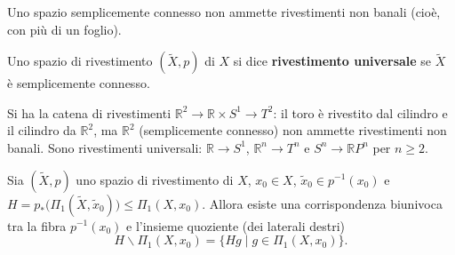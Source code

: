 \begin{observacion}
Uno spazio semplicemente connesso non ammette rivestimenti non banali (cio\`e, con pi\`u di un foglio).
\end{observacion}

\begin{definicion}
Uno spazio di rivestimento $(\widetilde{X}, p)$ di $X$ si dice \textbf{rivestimento universale} se $\widetilde{X}$ \`e semplicemente connesso.
\end{definicion}

\begin{ejemplo}
Si ha la catena di rivestimenti $\mathbb{R}^2 \to \mathbb{R} \times S^1 \to T^2$: il toro \`e rivestito dal cilindro e il cilindro da $\mathbb{R}^2$, ma $\mathbb{R}^2$ (semplicemente connesso) non ammette rivestimenti non banali. Sono rivestimenti universali: $\mathbb{R} \to S^1$, $\mathbb{R}^n \to T^n$ e $S^n \to \mathbb{R}P^n$ per $n \geqslant 2$.
\end{ejemplo}

\begin{teo}
Sia $(\widetilde{X}, p)$ uno spazio di rivestimento di $X$, $x_0 \in X$, $\widetilde{x}_0 \in p^{-1}(x_0)$ e $H = p_*\big(\Pi_1(\widetilde{X}, \widetilde{x}_0)\big) \leqslant \Pi_1(X, x_0)$. Allora esiste una corrispondenza biunivoca tra la fibra $p^{-1}(x_0)$ e l'insieme quoziente (dei laterali destri)
\[
H \backslash \Pi_1(X, x_0) = \big\{ Hg \mid g \in \Pi_1(X, x_0) \big\}.
\]
\end{teo}

